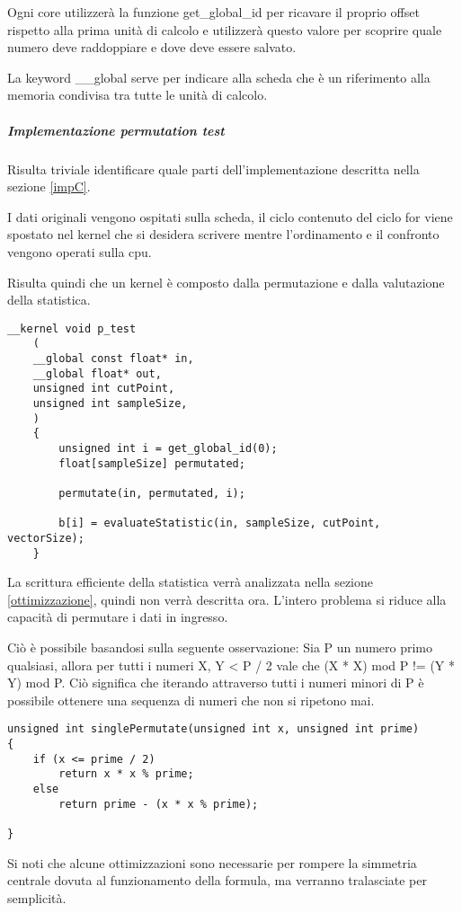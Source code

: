 Ogni core utilizzerà la funzione get\_global\_id per ricavare il proprio offset rispetto alla prima unità di calcolo e utilizzerà questo valore per scoprire quale numero deve raddoppiare e dove deve essere salvato.

La keyword \_\_global serve per indicare alla scheda che è un riferimento alla memoria condivisa tra tutte le unità di calcolo. 

\subparagraph{Implementazione permutation test}
Risulta triviale identificare quale parti dell'implementazione descritta nella sezione \ref{impC}.

I dati originali vengono ospitati sulla scheda, il ciclo contenuto del ciclo for viene spostato nel kernel che si desidera scrivere mentre l'ordinamento e il confronto vengono operati sulla cpu.


Risulta quindi che un kernel è composto dalla permutazione e dalla valutazione della statistica. 

\begin{lstlisting}[style=CStyle]
	__kernel void p_test
	(
	__global const float* in,
	__global float* out,
	unsigned int cutPoint,
	unsigned int sampleSize,
	)
	{
		unsigned int i = get_global_id(0);
		float[sampleSize] permutated;
		
		permutate(in, permutated, i);
		
		b[i] = evaluateStatistic(in, sampleSize, cutPoint, vectorSize);
	}
\end{lstlisting}

La scrittura efficiente della statistica verrà analizzata nella sezione \ref{ottimizzazione}, quindi non verrà descritta ora.
L'intero problema si riduce alla capacità di permutare i dati in ingresso.

Ciò è possibile basandosi sulla seguente osservazione:
Sia P un numero primo qualsiasi, allora per tutti i numeri X, Y < P / 2 vale che (X * X) mod P != (Y * Y) mod P.
Ciò significa che iterando attraverso tutti i numeri minori di P è possibile ottenere una sequenza di numeri che non si ripetono mai.
 
\begin{lstlisting}[style=CStyle]
unsigned int singlePermutate(unsigned int x, unsigned int prime)
{	
	if (x <= prime / 2)
		return x * x % prime;
	else
		return prime - (x * x % prime);	

}
\end{lstlisting}

Si noti che alcune ottimizzazioni sono necessarie per rompere la simmetria centrale dovuta al funzionamento della formula, ma verranno tralasciate per semplicità.

